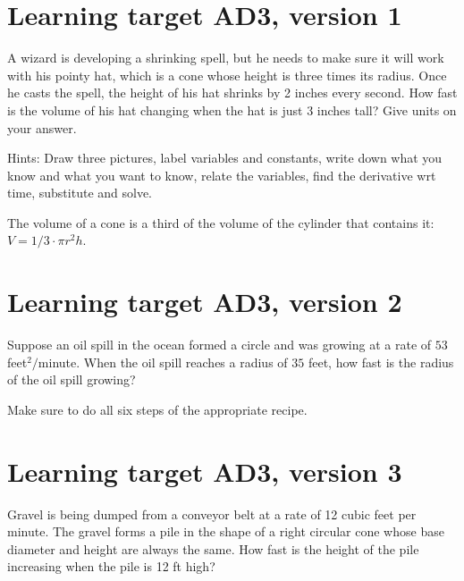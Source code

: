 
\usepackage{pgfplots}


%


\allowdisplaybreaks
\section{Learning target AD3, version 1}

A wizard is developing a shrinking spell, but he needs to make sure it will work with his pointy hat, which is a cone whose height is three times its radius. Once he casts the spell, the height of his hat shrinks by 2 inches every second. How fast is the volume of his hat changing when the hat is just 3 inches tall? Give units on your answer.

\vspace{1em}

{\tiny Hints: Draw three pictures, label variables and constants, write down what you know and what you want to know, relate the variables, find the derivative wrt time, substitute and solve. 

The volume of a cone is a third of the volume of the cylinder that contains it: $V = 1/3 \cdot \pi r^2 h$.}

\pagebreak

\section{Learning target AD3, version 2}

Suppose an oil spill in the ocean formed a circle and was growing at a rate of \(53\) feet\(^2/\)minute. When the oil spill reaches a radius of \(35\) feet, how fast is the radius of the oil spill growing? 

\vspace{1em}

Make sure to do all six steps of the appropriate recipe.


\pagebreak
\section{Learning target AD3, version 3}


Gravel is being dumped from a conveyor belt at a rate of 12 cubic feet per minute. The gravel forms a pile in the shape of a right circular cone whose base diameter and height are always the same. How fast is the height of the pile increasing when the pile is 12 ft high? 



